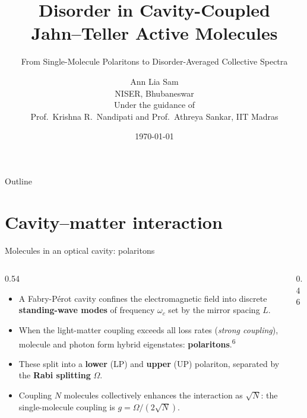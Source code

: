 \documentclass[aspectratio=169,11pt]{beamer}
\title[Disorder in Cavity JT Polaritons]{Disorder in Cavity-Coupled\\ Jahn--Teller Active Molecules}
\subtitle{From Single-Molecule Polaritons to Disorder-Averaged Collective Spectra}
\institute{Summer Internship 2026}
\author{Ann Lia Sam\\[0.6em]
NISER, Bhubaneswar\\[0.6em]
  {\normalsize Under the guidance of\\ Prof.\ Krishna R.\ Nandipati and Prof.\ Athreya Sankar, IIT Madras}}
\date{\today}
\newcommand{\refmark}[1]{\textsuperscript{\color{srcgray}#1}}
\begin{document}
{
\begin{frame}\titlepage\end{frame}}

\begin{frame}{Outline}
  \tableofcontents
\end{frame}

\section{Cavity--matter interaction}
\begin{frame}{Molecules in an optical cavity: polaritons}
  \begin{columns}[T]
    \begin{column}{0.54\textwidth}
      \small
      \begin{itemize}
        \item A Fabry-P\'erot cavity confines the electromagnetic field into
              discrete \textbf{standing-wave modes} of frequency $\omega_c$ set
              by the mirror spacing $L$.
        \item When the light-matter coupling exceeds all loss rates
              (\emph{strong coupling}), molecule and photon form hybrid
              eigenstates: \textbf{polaritons}.\refmark{6}
        \item These split into a \textbf{lower} (LP) and \textbf{upper} (UP)
              polariton, separated by the \textbf{Rabi splitting} $\Omega$.
        \item Coupling $N$ molecules collectively enhances the interaction as
              $\sqrt{N}$: the single-molecule coupling is
              $g=\Omega/(2\sqrt N)$.
      \end{itemize}
    \end{column}
    \begin{column}{0.46\textwidth}
      \centering
\end{column}
\end{columns}
\end{frame}
\end{document}
